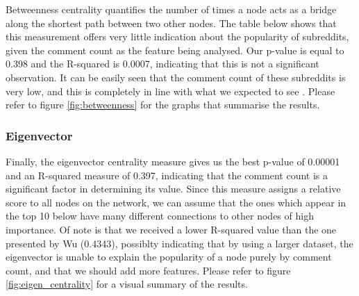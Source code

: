 \documentclass[bsc,frontabs,twoside,singlespacing,parskip,deptreport]{infthesis}
\begin{document}
Betweenness centrality quantifies the number of times a node acts as a bridge along the shortest path between two other nodes. The table below shows that this measurement offers very little indication about the popularity of subreddits, given the comment count as the feature being analysed. Our p-value is equal to 0.398 and the R-squared is 0.0007, indicating that this is not a significant observation. It can be easily seen that the comment count of these subreddits is very low, and this is completely in line with what we expected to see \cite{masters}. Please refer to figure \ref{fig:betweenness} for the graphs that summarise the results. 

\begin{table}[!h]
\centering
{}
\caption{Top 10 subreddits ordered by their betweenness score}
\label{top-betweenness}
\end{table}

\subsubsection{Eigenvector}

Finally, the eigenvector centrality measure gives us the best p-value of 0.00001 and an R-squared measure of 0.397, indicating that the comment count is a significant factor in determining its value. Since this measure assigns a relative score to all nodes on the network, we can assume that the ones which appear in the top 10 below have many different connections to other nodes of high importance. Of note is that we received a lower R-squared value than the one presented by Wu \cite{masters} (0.4343), possiblty indicating that by using a larger dataset, the eigenvector is unable to explain the popularity of a node purely by comment count, and that we should add more features. Please refer to figure \ref{fig:eigen_centrality} for a visual summary of the results.
\end{document}
